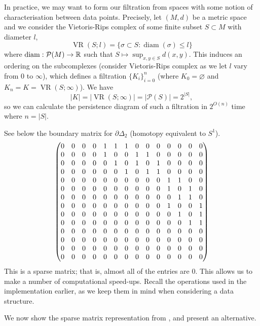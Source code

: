 In practice, we may want to form our filtration from spaces with some notion of characterisation between data points. Precisely, let $(M, d)$ be a metric space and we consider the Vietoris-Rips complex of some finite subset $S \subset M$ with diameter $l$,
\[ \operatorname{VR}(S; l) = \{ \sigma \subset S: \operatorname{diam}(\sigma) \leq l\} \]
where $\operatorname{diam}: \mathcal P(M) \to \mathbb{R}$ such that $S \mapsto \sup_{x, y \in S} d(x, y)$. This induces an ordering on the subcomplexes (consider Vietoris-Rips complex as we let $l$ vary from $0$ to $\infty$), which defines a filtration $\{K_i\}_{i=0}^n$ (where $K_0 = \varnothing$ and $K_n = K = \operatorname{VR}(S; \infty)$). We have
\[
  \lvert K \rvert 
  = \lvert \operatorname{VR}(S; \infty) \rvert 
  = \lvert \mathcal P(S) \rvert 
  = 2^{\lvert S \rvert},
\]
so we can calculate the persistence diagram of such a filtration in $2^{O(n)}$ time where $n = \lvert S \rvert$. 

See below the boundary matrix for $\partial\Delta_2$ (homotopy equivalent to $S^1$). 
\[
  \setcounter{MaxMatrixCols}{20}
  \begin{pmatrix}
    0 & 0 & 0 & 0 & 1 & 1 & 1 & 0 & 0 & 0 & 0 & 0 & 0 & 0 \\
    0 & 0 & 0 & 0 & 1 & 0 & 0 & 1 & 1 & 0 & 0 & 0 & 0 & 0 \\
    0 & 0 & 0 & 0 & 0 & 1 & 0 & 1 & 0 & 1 & 0 & 0 & 0 & 0 \\
    0 & 0 & 0 & 0 & 0 & 0 & 1 & 0 & 1 & 1 & 0 & 0 & 0 & 0 \\
    0 & 0 & 0 & 0 & 0 & 0 & 0 & 0 & 0 & 0 & 1 & 1 & 0 & 0 \\
    0 & 0 & 0 & 0 & 0 & 0 & 0 & 0 & 0 & 0 & 1 & 0 & 1 & 0 \\
    0 & 0 & 0 & 0 & 0 & 0 & 0 & 0 & 0 & 0 & 0 & 1 & 1 & 0 \\
    0 & 0 & 0 & 0 & 0 & 0 & 0 & 0 & 0 & 0 & 1 & 0 & 0 & 1 \\
    0 & 0 & 0 & 0 & 0 & 0 & 0 & 0 & 0 & 0 & 0 & 1 & 0 & 1 \\
    0 & 0 & 0 & 0 & 0 & 0 & 0 & 0 & 0 & 0 & 0 & 0 & 1 & 1 \\
    0 & 0 & 0 & 0 & 0 & 0 & 0 & 0 & 0 & 0 & 0 & 0 & 0 & 0 \\
    0 & 0 & 0 & 0 & 0 & 0 & 0 & 0 & 0 & 0 & 0 & 0 & 0 & 0 \\
    0 & 0 & 0 & 0 & 0 & 0 & 0 & 0 & 0 & 0 & 0 & 0 & 0 & 0 \\
    0 & 0 & 0 & 0 & 0 & 0 & 0 & 0 & 0 & 0 & 0 & 0 & 0 & 0 \\
  \end{pmatrix}
  \setcounter{MaxMatrixCols}{10}
\]
This is a sparse matrix; that is, almost all of the entries are 0. This allows us to make a number of computational speed-ups. Recall the operations used in the implementation earlier, as we keep them in mind when considering a data structure. 

We now show the sparse matrix representation from \textcite{edelsbrunner2010computational}, and present an alternative.

